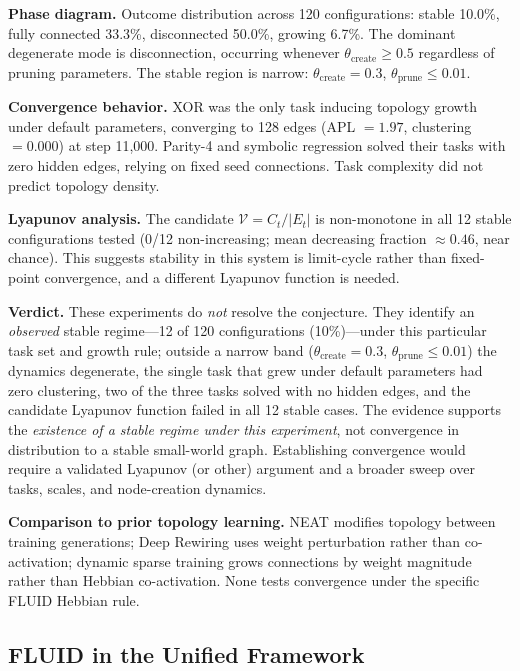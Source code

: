 \documentclass[12pt]{article}
\begin{document}
\textbf{Phase diagram.} Outcome distribution across 120 configurations: stable 10.0\%, fully connected 33.3\%, disconnected 50.0\%, growing 6.7\%. The dominant degenerate mode is disconnection, occurring whenever $\theta_{\text{create}} \geq 0.5$ regardless of pruning parameters. The stable region is narrow: $\theta_{\text{create}} = 0.3$, $\theta_{\text{prune}} \leq 0.01$.

\textbf{Convergence behavior.} XOR was the only task inducing topology growth under default parameters, converging to 128 edges (APL $= 1.97$, clustering $= 0.000$) at step 11,000. Parity-4 and symbolic regression solved their tasks with zero hidden edges, relying on fixed seed connections. Task complexity did not predict topology density.

\textbf{Lyapunov analysis.} The candidate $\mathcal{V} = C_t / |E_t|$ is non-monotone in all 12 stable configurations tested (0/12 non-increasing; mean decreasing fraction $\approx 0.46$, near chance). This suggests stability in this system is limit-cycle rather than fixed-point convergence, and a different Lyapunov function is needed.

\textbf{Verdict.} These experiments do \emph{not} resolve the conjecture. They identify an \emph{observed} stable regime---12 of 120 configurations (10\%)---under this particular task set and growth rule; outside a narrow band ($\theta_{\text{create}}=0.3$, $\theta_{\text{prune}}\leq 0.01$) the dynamics degenerate, the single task that grew under default parameters had zero clustering, two of the three tasks solved with no hidden edges, and the candidate Lyapunov function failed in all 12 stable cases. The evidence supports the \emph{existence of a stable regime under this experiment}, not convergence in distribution to a stable small-world graph. Establishing convergence would require a validated Lyapunov (or other) argument and a broader sweep over tasks, scales, and node-creation dynamics.

\textbf{Comparison to prior topology learning.} NEAT \cite{stanley2002} modifies topology between training generations; Deep Rewiring \cite{bellec2018} uses weight perturbation rather than co-activation; dynamic sparse training \cite{mocanu2018} grows connections by weight magnitude rather than Hebbian co-activation. None tests convergence under the specific FLUID Hebbian rule.

\subsection{FLUID in the Unified Framework}
\end{document}
